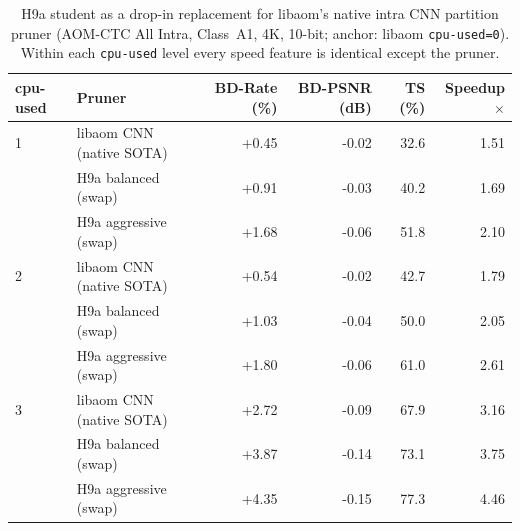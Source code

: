 \begin{table}[t]\centering
\caption{H9a student as a drop-in replacement for libaom's native intra CNN partition pruner (AOM-CTC All Intra, Class~A1, 4K, 10-bit; anchor: libaom \texttt{cpu-used=0}). Within each \texttt{cpu-used} level every speed feature is identical except the pruner.}
\label{tab:fase6-swap}
\begin{tabular}{llrrrr}
\toprule
cpu-used & Pruner & BD-Rate (\%) & BD-PSNR (dB) & TS (\%) & Speedup$\times$ \\
\midrule
1 & libaom CNN (native SOTA) & +0.45 & -0.02 & 32.6 & 1.51 \\
 & H9a balanced (swap) & +0.91 & -0.03 & 40.2 & 1.69 \\
 & H9a aggressive (swap) & +1.68 & -0.06 & 51.8 & 2.10 \\
\midrule
2 & libaom CNN (native SOTA) & +0.54 & -0.02 & 42.7 & 1.79 \\
 & H9a balanced (swap) & +1.03 & -0.04 & 50.0 & 2.05 \\
 & H9a aggressive (swap) & +1.80 & -0.06 & 61.0 & 2.61 \\
\midrule
3 & libaom CNN (native SOTA) & +2.72 & -0.09 & 67.9 & 3.16 \\
 & H9a balanced (swap) & +3.87 & -0.14 & 73.1 & 3.75 \\
 & H9a aggressive (swap) & +4.35 & -0.15 & 77.3 & 4.46 \\
\midrule
\bottomrule
\end{tabular}\end{table}

